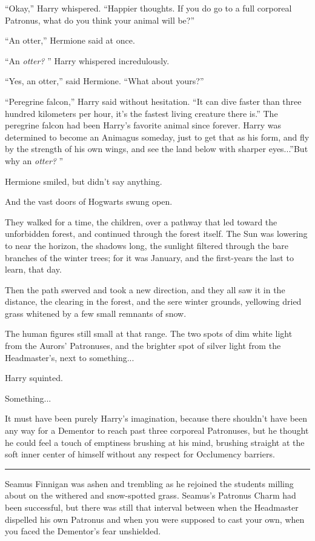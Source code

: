 ``Okay,'' Harry whispered. ``Happier thoughts. If you do go to a full
corporeal Patronus, what do you think your animal will be?''

``An otter,'' Hermione said at once.

``An \emph{otter?} '' Harry whispered incredulously.

``Yes, an otter,'' said Hermione. ``What about yours?''

``Peregrine falcon,'' Harry said without hesitation. ``It can dive
faster than three hundred kilometers per hour, it's the fastest living
creature there is.'' The peregrine falcon had been Harry's favorite
animal since forever. Harry was determined to become an Animagus
someday, just to get that as his form, and fly by the strength of his
own wings, and see the land below with sharper eyes...''But why an
\emph{otter?} ''

Hermione smiled, but didn't say anything.

And the vast doors of Hogwarts swung open.

They walked for a time, the children, over a pathway that led toward the
unforbidden forest, and continued through the forest itself. The Sun was
lowering to near the horizon, the shadows long, the sunlight filtered
through the bare branches of the winter trees; for it was January, and
the first-years the last to learn, that day.

Then the path swerved and took a new direction, and they all saw it in
the distance, the clearing in the forest, and the sere winter grounds,
yellowing dried grass whitened by a few small remnants of snow.

The human figures still small at that range. The two spots of dim white
light from the Aurors' Patronuses, and the brighter spot of silver light
from the Headmaster's, next to something...

Harry squinted.

Something...

It must have been purely Harry's imagination, because there shouldn't
have been any way for a Dementor to reach past three corporeal
Patronuses, but he thought he could feel a touch of emptiness brushing
at his mind, brushing straight at the soft inner center of himself
without any respect for Occlumency barriers.

\begin{center}\rule{3in}{0.4pt}\end{center}

Seamus Finnigan was ashen and trembling as he rejoined the students
milling about on the withered and snow-spotted grass. Seamus's Patronus
Charm had been successful, but there was still that interval between
when the Headmaster dispelled his own Patronus and when you were
supposed to cast your own, when you faced the Dementor's fear
unshielded.

